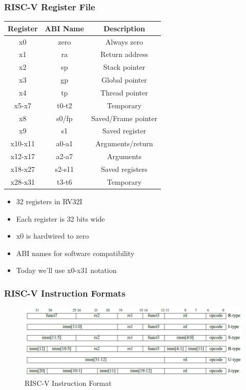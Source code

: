 \documentclass[aspectratio=169,xcolor=dvipsnames]{beamer}
\begin{document}
\begin{frame}
\frametitle{RISC-V Register File}
\begin{multicols}{2}
\begin{center}
\begin{tabular}{|c|c|c|}
\hline
\textbf{Register} & \textbf{ABI Name} & \textbf{Description} \\
\hline
x0 & zero & Always zero \\
x1 & ra & Return address \\
x2 & sp & Stack pointer \\
x3 & gp & Global pointer \\
x4 & tp & Thread pointer \\
x5-x7 & t0-t2 & Temporary \\
x8 & s0/fp & Saved/Frame pointer \\
x9 & s1 & Saved register \\
x10-x11 & a0-a1 & Arguments/return \\
x12-x17 & a2-a7 & Arguments \\
x18-x27 & s2-s11 & Saved registers \\
x28-x31 & t3-t6 & Temporary \\
\hline
\end{tabular}
\end{center}
\columnbreak
\begin{itemize}
    \item 32 registers in RV32I
    \item Each register is 32 bits wide
    \item x0 is hardwired to zero
    \item ABI names for software compatibility
    \item Today we'll use x0-x31 notation
\end{itemize}
\end{multicols}
\end{frame}

\begin{frame}
\frametitle{RISC-V Instruction Formats}
\begin{center}
\begin{figure}
    \centering
    \includegraphics[width=1.0\linewidth]{image.png}
    \caption{RISC-V Instruction Format}
    \label{fig:enter-label}
\end{figure}
\end{center}
\end{frame}
\end{document}
